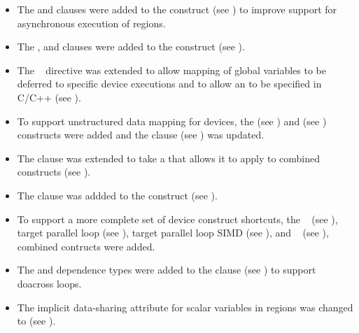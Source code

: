 \begin{itemize}
\item The  and  clauses were added to the 
       construct (see ) 
      to improve support for asynchronous execution of  regions. 

\item The ,  and  clauses 
      were added to the  construct (see ).

\item The ~ directive was extended to allow 
      mapping of global variables to be deferred to specific device 
      executions and to allow an 
      to be specified in C/C++ (see ).

\item To support unstructured data mapping for devices, the 
       (see ) and  (see ) constructs were added and the  clause 
      (see ) was updated.

\item The  clause was extended to take a
       that allows it to apply
      to combined constructs (see ).

\item The  clause was addded to the  construct
      (see ).

\item To support a more complete set of device construct shortcuts, the
      ~ (see ), 
      target parallel loop (see ),
      target parallel loop SIMD (see ),
      and ~ (see ),
      combined contructs were added.

\item The  and  dependence types were added to the 
       clause (see ) to support 
      doacross loops. 

\item The implicit data-sharing attribute for scalar variables in 
       regions was changed to  (see 
      ).
	 

\end{itemize}
